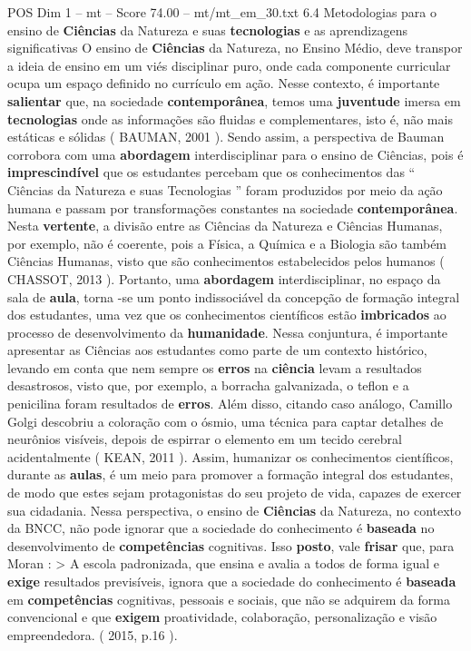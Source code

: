 \begin{textsample}{POS Dim 1 – mt – Score 74.00 – mt/mt\_em\_30.txt}  \label{ex:f1_pos_072}
6.4 Metodologias para o ensino de \textbf{Ciências} da Natureza e suas \textbf{tecnologias} e as aprendizagens significativas O ensino de \textbf{Ciências} da Natureza, no Ensino Médio, deve transpor a ideia de ensino em um viés disciplinar puro, onde cada componente curricular ocupa um espaço definido no currículo em ação.
Nesse contexto, é importante \textbf{salientar} que, na sociedade \textbf{contemporânea}, temos uma \textbf{juventude} imersa em \textbf{tecnologias} onde as informações são fluidas e complementares, isto é, não mais estáticas e sólidas ( BAUMAN, 2001 ).
Sendo assim, a perspectiva de Bauman corrobora com uma \textbf{abordagem} interdisciplinar para o ensino de Ciências, pois é \textbf{imprescindível} que os estudantes percebam que os conhecimentos das “ Ciências da Natureza e suas Tecnologias ” foram produzidos por meio da ação humana e passam por transformações constantes na sociedade \textbf{contemporânea}.
Nesta \textbf{vertente}, a divisão entre as Ciências da Natureza e Ciências Humanas, por exemplo, não é coerente, pois a Física, a Química e a Biologia são também Ciências Humanas, visto que são conhecimentos estabelecidos pelos humanos ( CHASSOT, 2013 ).
Portanto, uma \textbf{abordagem} interdisciplinar, no espaço da sala de \textbf{aula}, torna -se um ponto indissociável da concepção de formação integral dos estudantes, uma vez que os conhecimentos científicos estão \textbf{imbricados} ao processo de desenvolvimento da \textbf{humanidade}.
Nessa conjuntura, é importante apresentar as Ciências aos estudantes como parte de um contexto histórico, levando em conta que nem sempre os \textbf{erros} na \textbf{ciência} levam a resultados desastrosos, visto que, por exemplo, a borracha galvanizada, o teflon e a penicilina foram resultados de \textbf{erros}.
Além disso, citando caso análogo, Camillo Golgi descobriu a coloração com o ósmio, uma técnica para captar detalhes de neurônios visíveis, depois de espirrar o elemento em um tecido cerebral acidentalmente ( KEAN, 2011 ).
Assim, humanizar os conhecimentos científicos, durante as \textbf{aulas}, é um meio para promover a formação integral dos estudantes, de modo que estes sejam protagonistas do seu projeto de vida, capazes de exercer sua cidadania.
Nessa perspectiva, o ensino de \textbf{Ciências} da Natureza, no contexto da BNCC, não pode ignorar que a sociedade do conhecimento é \textbf{baseada} no desenvolvimento de \textbf{competências} cognitivas.
Isso \textbf{posto}, vale \textbf{frisar} que, para Moran : > A escola padronizada, que ensina e avalia a todos de forma igual e \textbf{exige} resultados previsíveis, ignora que a sociedade do conhecimento é \textbf{baseada} em \textbf{competências} cognitivas, pessoais e sociais, que não se adquirem da forma convencional e que \textbf{exigem} proatividade, colaboração, personalização e visão empreendedora. ( 2015, p.16 ).

\end{textsample}
